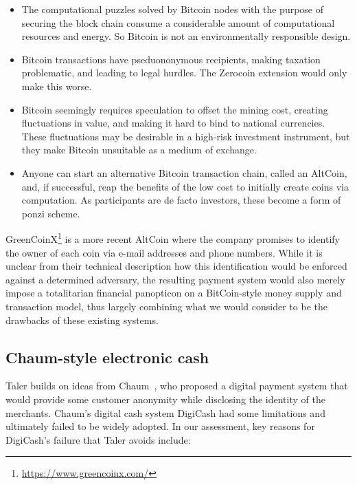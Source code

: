 \documentclass{llncs}
\begin{document}
\begin{itemize}
  \item The computational puzzles solved by Bitcoin nodes with the purpose
    of securing the block chain consume a considerable amount of computational
    resources and energy.  So Bitcoin is not an environmentally responsible
    design.
  \item Bitcoin transactions have pseduononymous recipients, making taxation
    problematic, and leading to legal hurdles.
    The Zerocoin extension would only make this worse.
  \item Bitcoin seemingly requires speculation to offset the mining cost,
    creating fluctuations in value, and making it hard to bind to national
    currencies.  These fluctuations may be desirable in a high-risk investment
    instrument, but they make Bitcoin unsuitable as a medium of exchange.
  \item Anyone can start an alternative Bitcoin transaction chain,
    called an AltCoin, and, if successful, reap the benefits of the low
    cost to initially create coins via computation.  As participants are
    de facto investors, these become a form of ponzi scheme.
\end{itemize}

GreenCoinX\footnote{\url{https://www.greencoinx.com/}} is a more
recent AltCoin where the company promises to identify the owner of
each coin via e-mail addresses and phone numbers.  While it is unclear
from their technical description how this identification would be
enforced against a determined adversary, the resulting payment system
would also merely impose a totalitarian financial panopticon on a
BitCoin-style money supply and transaction model, thus largely
combining what we would consider to be the drawbacks of these existing
systems.

\subsection{Chaum-style electronic cash}

Taler builds on ideas from Chaum~\cite{chaum1983blind}, who proposed a
digital payment system that would provide some customer anonymity
while disclosing the identity of the merchants.  Chaum's digital cash
system DigiCash had some limitations and ultimately failed to be widely
adopted.  In our assessment, key reasons for DigiCash's failure that
Taler avoids include:
\end{document}
